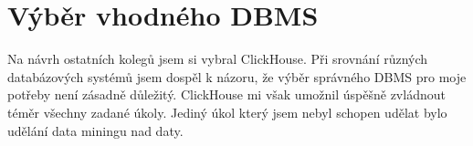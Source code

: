 \chapter{Výběr vhodného DBMS}
Na návrh ostatních kolegů jsem si vybral ClickHouse. Při srovnání různých databázových systémů jsem dospěl k názoru, že výběr správného DBMS pro moje potřeby není zásadně důležitý. ClickHouse mi však umožnil úspěšně zvládnout téměr všechny zadané úkoly. Jediný úkol který jsem nebyl schopen udělat bylo udělání data miningu nad daty.